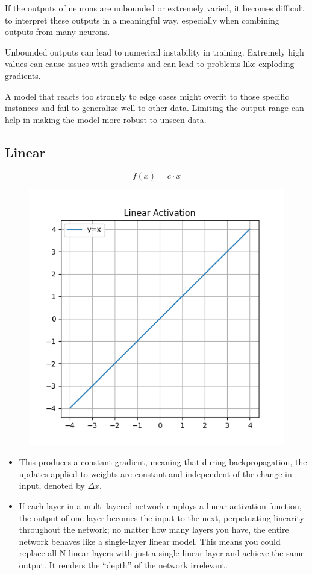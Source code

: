 \documentclass[11pt]{article}
\begin{document}
If the outputs of neurons are unbounded or extremely varied, it becomes difficult to interpret these outputs in a meaningful way, especially when combining outputs from many neurons.

Unbounded outputs can lead to numerical instability in training. Extremely high values can cause issues with gradients and can lead to problems like exploding gradients.

A model that reacts too strongly to edge cases might overfit to those specific instances and fail to generalize well to other data. Limiting the output range can help in making the model more robust to unseen data.

\subsection{Linear}

\begin{definition}\label{eq:activation-linear}
    \begin{equation*}
        f(x) = c\cdot x
    \end{equation*}
\end{definition}

\begin{figure}[H]
    \centering
    \includegraphics*[width=.4\linewidth]{figures/Linear Activation.png}\label{fig:linear}
\end{figure}

\begin{itemize}
    \item This produces a constant gradient, meaning that during backpropagation, the updates applied to weights are constant and independent of the change in input, denoted by $\Delta x$.
    \item If each layer in a multi-layered network employs a linear activation function, the output of one layer becomes the input to the next, perpetuating linearity throughout the network; no matter how many layers you have, the entire network behaves like a single-layer linear model. This means you could replace all N linear layers with just a single linear layer and achieve the same output. It renders the ``depth'' of the network irrelevant. 
\end{itemize}
\end{document}
